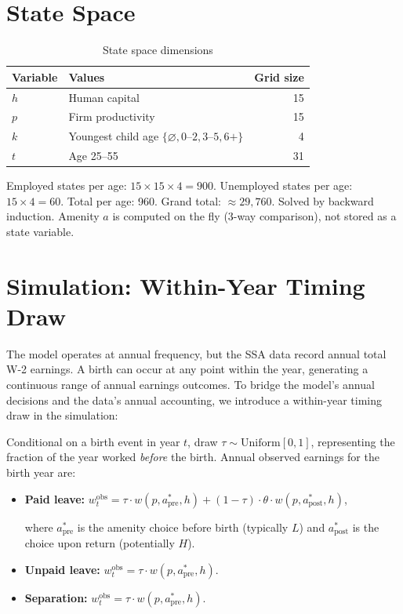 \documentclass[11pt]{article}
\begin{document}
\section{State Space}

\begin{table}[h]\centering
\caption{State space dimensions}
\begin{tabular}{llr}
\toprule
Variable & Values & Grid size \\
\midrule
$h$ & Human capital & 15 \\
$p$ & Firm productivity & 15 \\
$k$ & Youngest child age $\{\varnothing, 0\text{--}2, 3\text{--}5, 6+\}$ & 4 \\
$t$ & Age 25--55 & 31 \\
\bottomrule
\end{tabular}
\end{table}

\noindent Employed states per age: $15 \times 15 \times 4 = 900$. Unemployed states per age: $15 \times 4 = 60$. Total per age: 960. Grand total: $\approx 29{,}760$. Solved by backward induction. Amenity $a$ is computed on the fly (3-way comparison), not stored as a state variable.

\section{Simulation: Within-Year Timing Draw}\label{sec:timing}

The model operates at annual frequency, but the SSA data record annual total W-2 earnings. A birth can occur at any point within the year, generating a continuous range of annual earnings outcomes. To bridge the model's annual decisions and the data's annual accounting, we introduce a within-year timing draw in the simulation:

\medskip\noindent Conditional on a birth event in year $t$, draw $\tau \sim \text{Uniform}[0, 1]$, representing the fraction of the year worked \emph{before} the birth. Annual observed earnings for the birth year are:

\begin{itemize}[nosep]
  \item \textbf{Paid leave:} $w_t^{\text{obs}} = \tau \cdot w(p, a^*_{\text{pre}}, h) + (1 - \tau) \cdot \theta \cdot w(p, a^*_{\text{post}}, h)$,

    where $a^*_{\text{pre}}$ is the amenity choice before birth (typically $L$) and $a^*_{\text{post}}$ is the choice upon return (potentially $H$).
  \item \textbf{Unpaid leave:} $w_t^{\text{obs}} = \tau \cdot w(p, a^*_{\text{pre}}, h)$.
  \item \textbf{Separation:} $w_t^{\text{obs}} = \tau \cdot w(p, a^*_{\text{pre}}, h)$.
\end{itemize}
\end{document}
